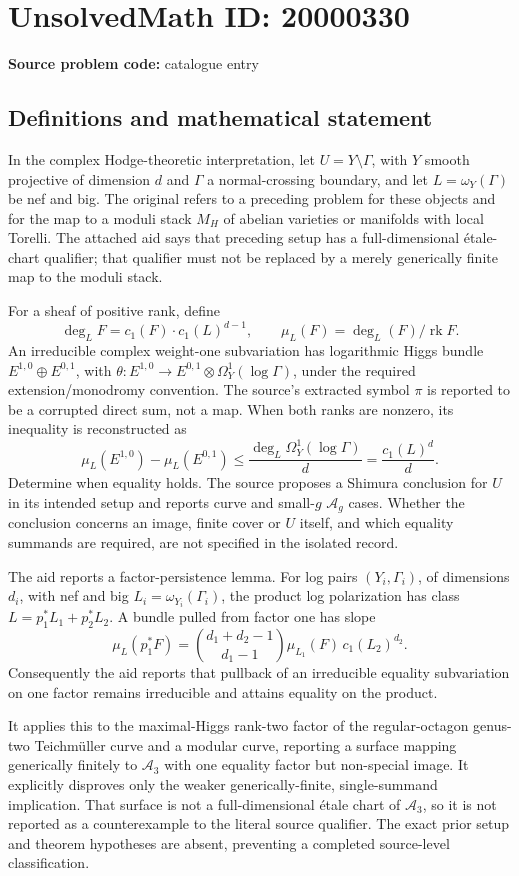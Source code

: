 \documentclass[11pt]{article}
\begin{document}
\section*{UnsolvedMath ID: 20000330}
\textbf{Source problem code:} catalogue entry
\subsection{Definitions and mathematical statement}
In the complex Hodge-theoretic interpretation, let \(U=Y\setminus\Gamma\), with \(Y\) smooth projective of dimension \(d\) and \(\Gamma\) a normal-crossing boundary, and let \(L=\omega_Y(\Gamma)\) be nef and big. The original refers to a preceding problem for these objects and for the map to a moduli stack \(M_H\) of abelian varieties or manifolds with local Torelli. The attached aid says that preceding setup has a full-dimensional \'etale-chart qualifier; that qualifier must not be replaced by a merely generically finite map to the moduli stack.

For a sheaf of positive rank, define
\[
\deg_L F=c_1(F)\cdot c_1(L)^{d-1},\qquad
\mu_L(F)=\deg_L(F)/\operatorname{rk}F.
\]
An irreducible complex weight-one subvariation has logarithmic Higgs bundle \(E^{1,0}\oplus E^{0,1}\), with \(\theta:E^{1,0}\to E^{0,1}\otimes\Omega_Y^1(\log\Gamma)\), under the required extension/monodromy convention. The source's extracted symbol \(\pi\) is reported to be a corrupted direct sum, not a map. When both ranks are nonzero, its inequality is reconstructed as
\[
\mu_L(E^{1,0})-\mu_L(E^{0,1})
\leq\frac{\deg_L\Omega_Y^1(\log\Gamma)}d
=\frac{c_1(L)^d}{d}.
\]
Determine when equality holds. The source proposes a Shimura conclusion for \(U\) in its intended setup and reports curve and small-\(g\) \(\mathcal A_g\) cases. Whether the conclusion concerns an image, finite cover or \(U\) itself, and which equality summands are required, are not specified in the isolated record.

The aid reports a factor-persistence lemma. For log pairs \((Y_i,\Gamma_i)\), of dimensions \(d_i\), with nef and big \(L_i=\omega_{Y_i}(\Gamma_i)\), the product log polarization has class \(L=p_1^*L_1+p_2^*L_2\). A bundle pulled from factor one has slope
\[
\mu_L(p_1^*F)=\binom{d_1+d_2-1}{d_1-1}
\mu_{L_1}(F)\,c_1(L_2)^{d_2}.
\]
Consequently the aid reports that pullback of an irreducible equality subvariation on one factor remains irreducible and attains equality on the product.

It applies this to the maximal-Higgs rank-two factor of the regular-octagon genus-two Teichm\"uller curve and a modular curve, reporting a surface mapping generically finitely to \(\mathcal A_3\) with one equality factor but non-special image. It explicitly disproves only the weaker generically-finite, single-summand implication. That surface is not a full-dimensional \'etale chart of \(\mathcal A_3\), so it is not reported as a counterexample to the literal source qualifier. The exact prior setup and theorem hypotheses are absent, preventing a completed source-level classification.
\end{document}
